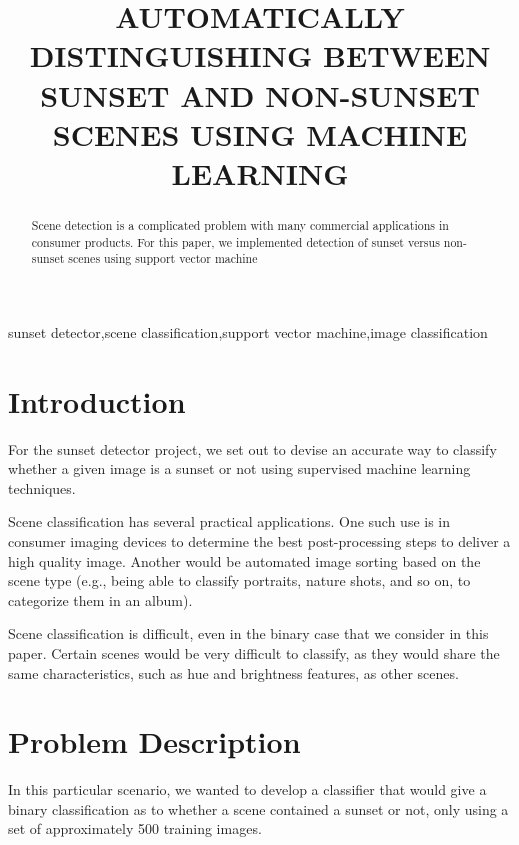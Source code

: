 \documentclass{article}
\begin{document}
\sloppy

\title{AUTOMATICALLY DISTINGUISHING BETWEEN SUNSET AND NON-SUNSET SCENES USING MACHINE LEARNING}
%
\address{Rose-Hulman Institute of Technology \\
Email: kampernj@rose-hulman.edu and henderea@rose-hulman.edu}


\maketitle
\thispagestyle{fancy} \fancyhead{} \lhead{}
\renewcommand{\headrulewidth}{0pt}
\renewcommand{\footrulewidth}{0pt}




%
\begin{abstract}
Scene detection is a complicated problem with many commercial applications in 
consumer products. For this paper, we implemented detection of sunset versus 
non-sunset scenes using  support vector machine
\end{abstract}

%
\begin{keywords}
sunset detector,scene classification,support vector machine,image classification
\end{keywords}

%
\section{Introduction}
\label{sec:intro}
For the sunset detector project, we set out to devise an accurate way to classify
whether a given image is a sunset or not using supervised machine learning techniques.

Scene classification has several practical applications. One such use is in consumer
imaging devices to determine the best post-processing steps to deliver a high quality
image. Another would be automated image sorting based on the scene type (e.g., being 
able to classify portraits, nature shots, and so on, to categorize them in an album). 

Scene classification is difficult, even in the binary case that we consider in this
paper. Certain scenes would be very difficult to classify, as they would share the
same characteristics, such as hue and brightness features, as other scenes.

\section{Problem Description}
\label{sec:probdesc}
In this particular scenario, we wanted to develop a classifier that would give a binary
classification as to whether a scene contained a sunset or not, only using a set of 
approximately 500 training images.  
\end{document}
